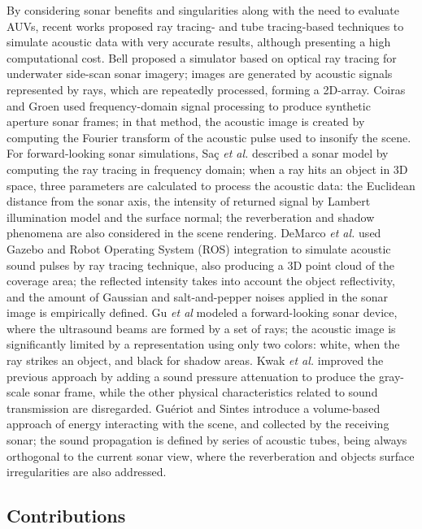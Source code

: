 \documentclass[final,5p,times]{elsarticle}
\begin{document}
By considering sonar benefits and singularities along with the need to evaluate AUVs, recent works proposed ray tracing- \cite{bell1997,coiras2009,sac2015,demarco2015,gu2013,kwak2015}
and tube tracing-based \cite{gueriot2010} techniques to simulate acoustic data
with very accurate results, although presenting a high computational cost.
Bell \cite{bell1997} proposed a simulator based on optical ray tracing for
underwater side-scan sonar imagery; images are generated by acoustic
signals represented by rays, which are repeatedly processed, forming a
2D-array. Coiras and Groen \cite{coiras2009} used frequency-domain
signal processing to produce synthetic aperture sonar frames; in that method,
the acoustic image is created by computing the Fourier transform of the
acoustic pulse used to insonify the scene. For forward-looking sonar
simulations, Saç \textit{et al.}
\cite{sac2015} described a sonar model by computing the ray tracing in
frequency domain; when a ray hits an object in 3D space, three parameters
are calculated to process the acoustic data: the Euclidean distance from
the sonar axis, the intensity of returned signal by Lambert illumination
model and the surface normal; the reverberation and shadow phenomena are
also considered in the scene rendering. DeMarco \textit{et al.}
\cite{demarco2015} used Gazebo and Robot Operating System (ROS)
\cite{quigley2009} integration to simulate acoustic sound pulses by
ray tracing technique, also producing a 3D point cloud of the coverage area; the reflected intensity takes into account the object reflectivity, and the amount of Gaussian and salt-and-pepper noises applied in the sonar image is empirically defined. Gu \textit{et al} \cite{gu2013} modeled a forward-looking sonar device, where the ultrasound beams are formed by a set of rays; the acoustic image is significantly limited by a representation using only two colors: white, when the ray strikes an object, and black for shadow areas. Kwak \textit{et al.} \cite{kwak2015} improved the previous approach by adding a sound pressure attenuation to produce the gray-scale sonar frame, while the other physical characteristics related to sound transmission are disregarded. Guériot and Sintes \cite{gueriot2010} introduce a volume-based
approach of energy interacting with the scene, and collected by the receiving
sonar; the sound propagation is defined by series of acoustic tubes, being
always orthogonal to the current sonar view, where the reverberation and
objects surface irregularities are also addressed.

\subsection{Contributions}
\end{document}
